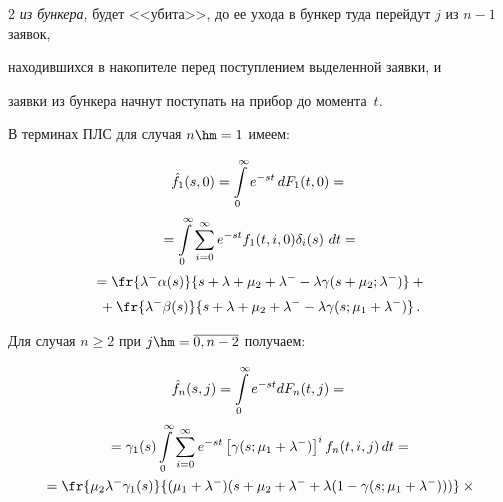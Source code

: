 \begin{multicols}{2}
\textit{из бункера}, будет <<убита>>, до ее ухода в бункер туда перейдут $j$ из $n-1$ заявок,


находившихся в накопителе перед поступлением выделенной заявки, и


заявки из бункера начнут поступать на прибор до момента~$t$.


В терминах ПЛС для случая $n\hm=1$ имеем:


\begin{multline*}


\hat f_1(s,0) = \int\limits_{0}^\infty


e^{-st}\, dF_1(t,0) = {}\\[2pt]


{}=\int\limits_{0}^{\infty}


\sum\limits_{i=0}^{\infty} e^{-st}


f_1(t,i,0) \delta_i(s)\ dt ={}


\\[2pt]


{}=


\fr{\lambda^- \alpha (s) }{s+\lambda+\mu_2 + \lambda^- - \lambda \gamma(s+\mu_2;\lambda^-)}


+{}\\[2pt]


{}+


\fr{\lambda^-\beta (s)}{s+\lambda+\mu_2 + \lambda^- - \lambda \gamma(s; \mu_1+ \lambda^-)}\,.


\end{multline*}





Для случая $n \ge 2$ при $j\hm=\overline{0,n-2}$ получаем:


\begin{multline*}


\hat f_n(s,j)=\int\limits_{0}^\infty e^{-st} dF_n(t,j)={}\\[2pt]


{}= \gamma_1(s) \int\limits_{0}^{\infty}


\sum\limits_{i=0}^{\infty} e^{-st}


\left[\gamma(s;\mu_1 + \lambda^-)\right]^i


f_n(t,i,j)\, dt = {}\\


{}=


\fr{\mu_2 \lambda^- \gamma_1(s) }{


(\mu_1+\lambda^-)(s + \mu_2 + \lambda^- + \lambda (1 - \gamma(s;\mu_1 + \lambda^-)))}\times{}\\[2pt]



\end{multline*}
\end{multicols}
